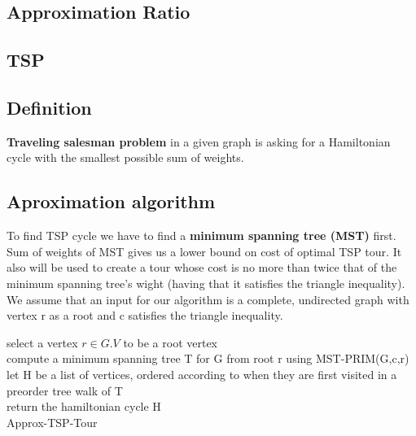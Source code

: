 \documentclass[runningheads, a4paper]{llncs}
\begin{document}
\subsection{Approximation Ratio}

\subsection{TSP}

\subsection{Definition}
\textbf{Traveling salesman problem} in a given graph is asking for a Hamiltonian cycle with the smallest possible sum of weights.

\subsection{Aproximation algorithm}

To find TSP cycle we have to find a \textbf{minimum spanning tree (MST)} first. Sum of weights of MST gives us a lower bound on cost of optimal TSP tour. It also will be used to create a tour whose cost is no more than twice that of the minimum spanning tree's wight (having that it satisfies the triangle inequality). We assume that an input for our algorithm is a complete, undirected graph with vertex r as a root and c satisfies the triangle inequality.


\begin{algorithm}[H]
    select a vertex $r \in G.V$ to be a root vertex \\
    
    compute a minimum spanning tree T for G from root r using MST-PRIM(G,c,r) \\
    
    let H be a list of vertices, ordered according to when they are first visited in a preorder tree walk of T \\
    
    return the hamiltonian cycle H \\
    
    	
   		  		
    \caption{Approx-TSP-Tour}
    \label{algo:hc_improved}
\end{algorithm}
\end{document}
